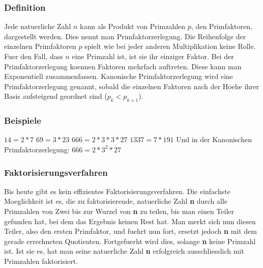 \subsubsection{Definition}
Jede natuerliche Zahl $n$ kann als Produkt von Primzahlen $p$, den Primfaktoren, dargestellt werden. Dies nennt man Primfaktorzerlegung. Die Reihenfolge der einzelnen Primfaktoren $p$ spielt wie bei jeder anderen Multiplikation keine Rolle. Fuer den Fall, dass $n$ eine Primzahl ist, ist sie ihr einziger Faktor. Bei der Primfaktorzerlegung koennen Faktoren mehrfach auftreten. Diese kann man Exponentiell zusammenfassen. Kanonische Primfaktorzerlegung wird eine Primfaktorzerlegung genannt, sobald die einzelnen Faktoren nach der Hoehe ihrer Basis aufsteigend geordnet sind ($p_k < p_{k+1}$).
\subsubsection{Beispiele}
$14 = 2 * 7$\newline
$69 = 3 * 23$\newline
$666 = 2 * 3 * 3 * 27$\newline
$1337 = 7 * 191$\newline\newline
Und in der Kanonischen Primfaktorzerlegung:\newline\newline
$666 = 2 * 3^2 * 27$
\subsubsection{Faktorisierungsverfahren}
Bis heute gibt es kein effizientes Faktorisierungsverfahren. Die einfachste Moeglichkeit ist es, die zu faktorisierende, natuerliche Zahl \textbf{n} durch alle Primzahlen von Zwei bis zur Wurzel von \textbf{n} zu teilen, bis man einen Teiler gefunden hat, bei dem das Ergebnis keinen Rest hat. Man merkt sich nun diesen Teiler, also den ersten Primfaktor, und fuehrt nun fort, ersetzt jedoch \textbf{n} mit dem gerade errechneten Quotienten. Fortgefuerht wird dies, solange \textbf{n} keine Primzahl ist. Ist sie es, hat man seine natuerliche Zahl \textbf{n} erfolgreich ausschliesslich mit Primzahlen faktorisiert.
